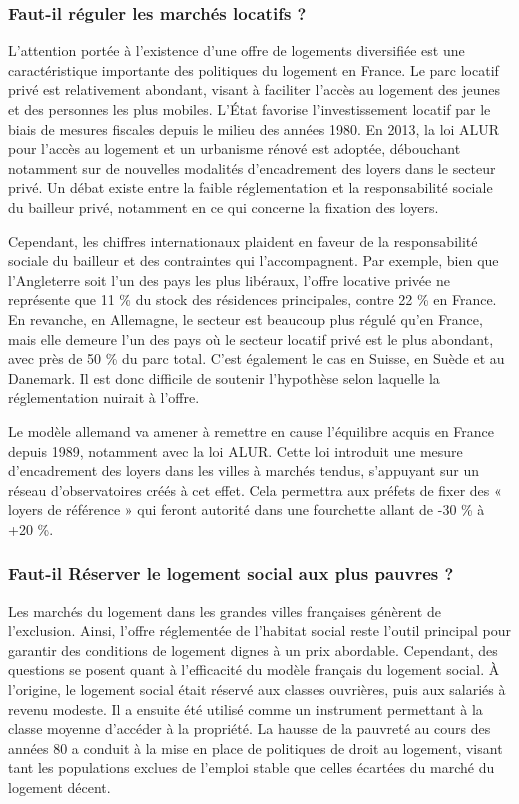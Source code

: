 \documentclass[a4paper, 12pt]{report}
\begin{document}
\subsubsection{Faut-il réguler les marchés locatifs ?}

L’attention portée à l’existence d’une offre de logements diversifiée est une caractéristique importante des politiques du logement en France. Le parc locatif privé est relativement abondant, visant à faciliter l’accès au logement des jeunes et des personnes les plus mobiles. L’État favorise l’investissement locatif par le biais de mesures fiscales depuis le milieu des années 1980. En 2013, la loi ALUR pour l’accès au logement et un urbanisme rénové est adoptée, débouchant notamment sur de nouvelles modalités d’encadrement des loyers dans le secteur privé. Un débat existe entre la faible réglementation et la responsabilité sociale du bailleur privé, notamment en ce qui concerne la fixation des loyers.

Cependant, les chiffres internationaux plaident en faveur de la responsabilité sociale du bailleur et des contraintes qui l'accompagnent. Par exemple, bien que l’Angleterre soit l’un des pays les plus libéraux, l’offre locative privée ne représente que 11 \% du stock des résidences principales, contre 22 \% en France. En revanche, en Allemagne, le secteur est beaucoup plus régulé qu’en France, mais elle demeure l’un des pays où le secteur locatif privé est le plus abondant, avec près de 50 \% du parc total. C’est également le cas en Suisse, en Suède et au Danemark. Il est donc difficile de soutenir l’hypothèse selon laquelle la réglementation nuirait à l’offre.

Le modèle allemand va amener à remettre en cause l’équilibre acquis en France depuis 1989, notamment avec la loi ALUR. Cette loi introduit une mesure d’encadrement des loyers dans les villes à marchés tendus, s’appuyant sur un réseau d’observatoires créés à cet effet. Cela permettra aux préfets de fixer des « loyers de référence » qui feront autorité dans une fourchette allant de -30 \% à +20 \%.

\subsubsection{Faut-il Réserver le logement social aux plus pauvres ?}

Les marchés du logement dans les grandes villes françaises génèrent de l’exclusion. Ainsi, l’offre réglementée de l’habitat social reste l’outil principal pour garantir des conditions de logement dignes à un prix abordable. Cependant, des questions se posent quant à l’efficacité du modèle français du logement social. À l’origine, le logement social était réservé aux classes ouvrières, puis aux salariés à revenu modeste. Il a ensuite été utilisé comme un instrument permettant à la classe moyenne d’accéder à la propriété. La hausse de la pauvreté au cours des années 80 a conduit à la mise en place de politiques de droit au logement, visant tant les populations exclues de l’emploi stable que celles écartées du marché du logement décent.
\end{document}
